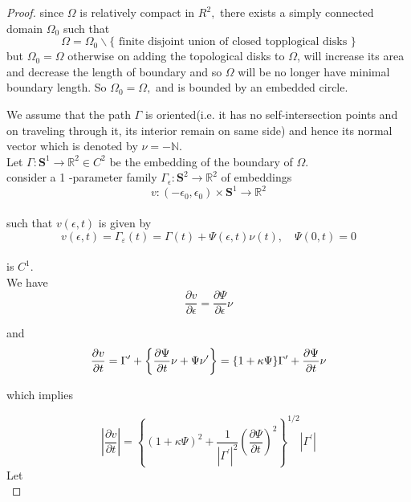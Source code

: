 \documentclass[oneside]{book}
\begin{document}
	
	\begin{proof}
		
		since $\Omega$ is relatively compact in $R^{2},$ there exists a simply connected
		domain $\Omega_{0}$ such that
		$$
		\Omega=\Omega_{0} \backslash\{\text{ finite disjoint union of closed topplogical disks 
		}\} $$
		but $\Omega_{0}=\Omega $ otherwise on adding the
		topological disks to $\Omega$, will increase its area  and decrease the length of boundary and so $\Omega$ will be no longer have minimal boundary length. So $\Omega_{0}=\Omega,$ and is bounded by an embedded circle.\par
		We assume that the path $\Gamma$ is oriented(i.e. it has no self-intersection points and on traveling through it, its interior remain on same side) and hence its normal vector which is denoted by $\nu = - \mathbb{N}$. \\
		
		
		Let $\Gamma: \mathbf{S}^{1} \rightarrow \mathbb{R}^{2} \in C^{2}$ be the embedding of the boundary of $\Omega .$ 
		 \\ 
		 consider a	1 -parameter family $\Gamma_{\epsilon}: \mathbf{S}^{2} \rightarrow \mathbb{R}^{2}$ of embeddings
		$$
		v:\left(-\epsilon_{0}, \epsilon_{0}\right) \times \mathbf{S}^{1} \rightarrow \mathbb{R}^{2}
		$$ \\
		such that  $v(\epsilon, t)$ is given by \\
		\begin{equation}
		\label{eq10}  
		v(\epsilon, t)=\Gamma_{\varepsilon}(t)=\Gamma(t)+\Psi(\epsilon, t) \nu(t), \quad \Psi(0, t)=0
		\end{equation} \\
		is $C^{1} .$ \\ \newpage
		We have
		\begin{equation}
		\label{eq11}  
		\frac{\partial v}{\partial \epsilon}=\frac{\partial \Psi}{\partial \epsilon} \nu
		\end{equation}
		
		and 
		\begin{equation}
		\label{eq12}  
		\\  \frac{\partial v}{\partial t}=\Gamma^{\prime}+\left\{\frac{\partial \Psi}{\partial t} \nu+\Psi \nu^{\prime}\right\}=\{1+\kappa \Psi\} \Gamma^{\prime}+\frac{\partial \Psi}{\partial t} \nu
		\end{equation}    
		
		which implies  
		
		$$\left|\frac{\partial v}{\partial t}\right|=\left\{(1+\kappa \Psi)^{2}+\frac{1}{\left|\Gamma^{\prime}\right|^{2}}\left(\frac{\partial \Psi}{\partial t}\right)^{2}\right\}^{1 / 2}\left|\Gamma^{\prime}\right|$$
		Let   \\
		

\end{proof}
\end{document}
